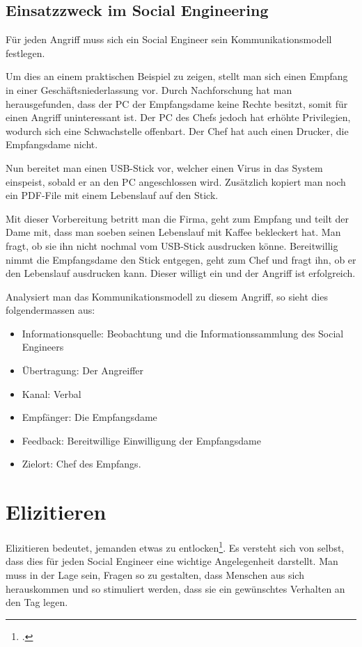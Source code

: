 \subsection{Einsatzzweck im Social Engineering}
Für jeden Angriff muss sich ein Social Engineer sein Kommunikationsmodell festlegen. 

Um dies an einem praktischen Beispiel zu zeigen, stellt man sich einen Empfang in einer Geschäftsniederlassung vor. Durch Nachforschung hat man herausgefunden, dass der PC der Empfangsdame keine Rechte besitzt, somit für einen Angriff uninteressant ist. Der PC des Chefs jedoch hat erhöhte Privilegien, wodurch sich eine Schwachstelle offenbart. Der Chef hat auch einen Drucker, die Empfangsdame nicht.

Nun bereitet man einen USB-Stick vor, welcher einen Virus in das System einspeist, sobald er an den PC angeschlossen wird. Zusätzlich kopiert man noch ein PDF-File mit einem Lebenslauf auf den Stick. 

Mit dieser Vorbereitung betritt man die Firma, geht zum Empfang und teilt der Dame mit, dass man soeben seinen Lebenslauf mit Kaffee bekleckert hat. Man fragt, ob sie ihn nicht nochmal vom USB-Stick ausdrucken könne. Bereitwillig nimmt die Empfangsdame den Stick entgegen, geht zum Chef und fragt ihn, ob er den Lebenslauf ausdrucken kann. Dieser willigt ein und der Angriff ist erfolgreich.

Analysiert man das Kommunikationsmodell zu diesem Angriff, so sieht dies folgendermassen aus:
\begin{itemize}
\item Informationsquelle: Beobachtung und die Informationssammlung des Social Engineers
\item Übertragung: Der Angreiffer
\item Kanal: Verbal
\item Empfänger: Die Empfangsdame
\item Feedback: Bereitwillige Einwilligung der Empfangsdame
\item Zielort: Chef des Empfangs.
\end{itemize}

\section{Elizitieren}
Elizitieren bedeutet, jemanden etwas zu entlocken\footcite{elizitieren__Wiktionary_2015-06-29}. Es versteht sich von selbst, dass dies für jeden Social Engineer eine wichtige Angelegenheit darstellt. Man muss in der Lage sein, Fragen so zu gestalten, dass Menschen aus sich herauskommen und so stimuliert werden, dass sie ein gewünschtes Verhalten an den Tag legen.

